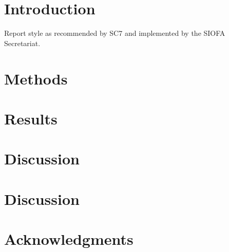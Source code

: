 \section{Introduction}

Report style as recommended by SC7 \citep{SC7} and implemented by the SIOFA Secretariat.

\section{Methods}

\section{Results}

\section{Discussion}

\section{Discussion}

\section{Acknowledgments}

 